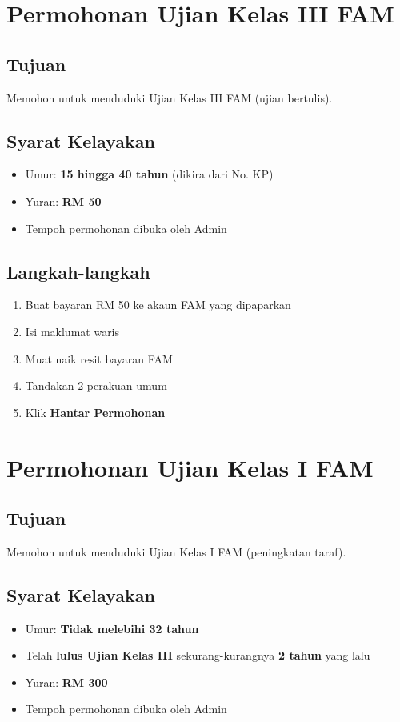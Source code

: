 \documentclass[12pt,a4paper]{report}
\newcommand{\btn}[1]{\colorbox{primaryblue!10}{\textcolor{primaryblue}{\textbf{#1}}}}
\begin{document}
\section{Permohonan Ujian Kelas III FAM}

\subsection{Tujuan}
Memohon untuk menduduki Ujian Kelas III FAM (ujian bertulis).

\subsection{Syarat Kelayakan}
\begin{itemize}[label=\textcolor{pbnpblue}{\faChevronRight}]
  \item Umur: \textbf{15 hingga 40 tahun} (dikira dari No. KP)
  \item Yuran: \textbf{RM 50}
  \item Tempoh permohonan dibuka oleh Admin
\end{itemize}

\subsection{Langkah-langkah}
\begin{enumerate}[label=\textcolor{pbnpblue}{\textbf{\arabic*.}}, leftmargin=2em]
  \item Buat bayaran RM 50 ke akaun FAM yang dipaparkan
  \item Isi maklumat waris
  \item Muat naik resit bayaran FAM
  \item Tandakan 2 perakuan umum
  \item Klik \btn{Hantar Permohonan}
\end{enumerate}

\section{Permohonan Ujian Kelas I FAM}

\subsection{Tujuan}
Memohon untuk menduduki Ujian Kelas I FAM (peningkatan taraf).

\subsection{Syarat Kelayakan}
\begin{itemize}[label=\textcolor{pbnpblue}{\faChevronRight}]
  \item Umur: \textbf{Tidak melebihi 32 tahun}
  \item Telah \textbf{lulus Ujian Kelas III} sekurang-kurangnya \textbf{2 tahun} yang lalu
  \item Yuran: \textbf{RM 300}
  \item Tempoh permohonan dibuka oleh Admin
\end{itemize}
\end{document}
